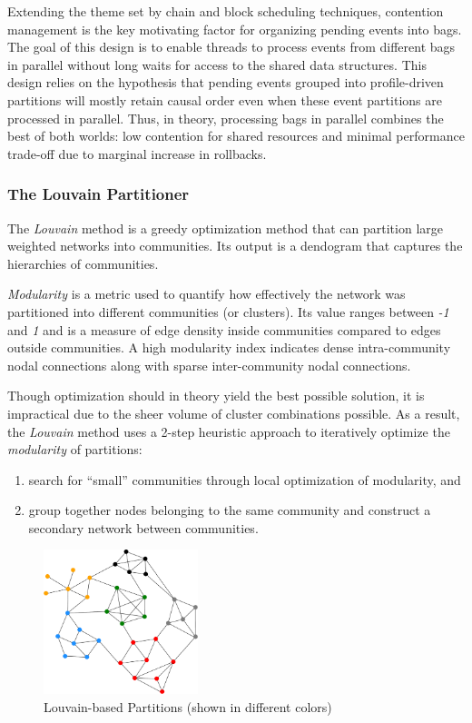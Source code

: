 \documentclass[11pt]{book}
\begin{document}
Extending the theme set by chain and block scheduling techniques, contention management is the key motivating
factor for organizing pending events into bags.  The goal of this design is to enable threads to process
events from different bags in parallel without long waits for access to the shared data structures.  This
design relies on the hypothesis that pending events grouped into profile-driven partitions will mostly retain
causal order even when these event partitions are processed in parallel.  Thus, in theory, processing bags in
parallel combines the best of both worlds: low contention for shared resources and minimal performance
trade-off due to marginal increase in rollbacks.

\subsubsection{The Louvain Partitioner}\label{subsubsec:louvain}

The \emph{Louvain} method \cite{blondel-08} is a greedy optimization method that can partition large weighted
networks into communities.  Its output is a dendogram that captures the hierarchies of communities.

\emph{Modularity} \cite{newman-06} is a metric used to quantify how effectively the network was partitioned
into different communities (or clusters).  Its value ranges between \emph{-1} and \emph{1} and is a measure of
edge density inside communities compared to edges outside communities.  A high modularity index indicates
dense intra-community nodal connections along with sparse inter-community nodal connections.

Though optimization should in theory yield the best possible solution, it is impractical due to the sheer
volume of cluster combinations possible.  As a result, the \emph{Louvain} method uses a 2-step heuristic
approach to iteratively optimize the \emph{modularity} of partitions:

\begin{enumerate}
\item search for ``small'' communities through local optimization of modularity, and 
\item group together nodes belonging to the same community and construct a secondary network between
  communities.
\end{enumerate}

\begin{figure}
    \centering
    \includegraphics[width=0.4\textwidth]{figures/louvain.pdf}
    \caption{Louvain-based Partitions (shown in different colors)}
    \label{fig:louvain_partitioning}
\end{figure}
\end{document}
